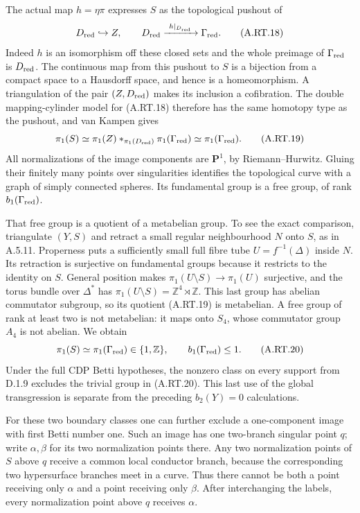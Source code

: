 The actual map $h=\eta\pi$ expresses $S$ as the topological
pushout of
\[
 D_{\rm red}\hookrightarrow Z,
 \qquad D_{\rm red}\xrightarrow{\ h|_{D_{\rm red}}\ }
                           \Gamma_{\rm red}.
 \tag{A.RT.18}
\]
Indeed $h$ is an isomorphism off these closed sets and the
whole preimage of $\Gamma_{\rm red}$ is $D_{\rm red}$.
The continuous map from this pushout to $S$ is a bijection
from a compact space to a Hausdorff space, and hence is a
homeomorphism. A triangulation of the pair
$(Z,D_{\rm red})$ makes its inclusion a cofibration.
The double mapping-cylinder model for (A.RT.18) therefore
has the same homotopy type as the pushout, and van Kampen
gives
\[
 \pi_1(S)\simeq
 \pi_1(Z)*_{\pi_1(D_{\rm red})}\pi_1(\Gamma_{\rm red})
 \simeq\pi_1(\Gamma_{\rm red}).
 \tag{A.RT.19}
\]
All normalizations of the image components are $\mathbf P^1$,
by Riemann--Hurwitz. Gluing their finitely many points over
singularities identifies the topological curve with a graph
of simply connected spheres. Its fundamental group is a
free group, of rank $b_1(\Gamma_{\rm red})$.

That free group is a quotient of a metabelian group. To see
the exact comparison, triangulate $(Y,S)$ and retract a small
regular neighbourhood $N$ onto $S$, as in A.5.11. Properness
puts a sufficiently small full fibre tube $U=f^{-1}(\Delta)$
inside $N$. Its retraction is surjective on fundamental
groups because it restricts to the identity on $S$.
General position makes
$\pi_1(U\setminus S)\to\pi_1(U)$ surjective, and the
torus bundle over $\Delta^*$ has
$\pi_1(U\setminus S)=\mathbb Z^4\rtimes\mathbb Z$.
This last group has abelian commutator subgroup, so its
quotient (A.RT.19) is metabelian. A free group of rank at
least two is not metabelian: it maps onto $S_4$, whose
commutator group $A_4$ is not abelian. We obtain
\[
 \pi_1(S)\simeq\pi_1(\Gamma_{\rm red})\in\{1,\mathbb Z\},
 \qquad b_1(\Gamma_{\rm red})\le1.
 \tag{A.RT.20}
\]
Under the full CDP Betti hypotheses, the nonzero class on
every support from D.1.9 excludes the trivial group in
(A.RT.20). This last use of the global transgression is
separate from the preceding $b_2(Y)=0$ calculations.

For these two boundary classes one can further exclude a
one-component image with first Betti number one. Such an image
has one two-branch singular point $q$; write $\alpha,\beta$
for its two normalization points there. Any two normalization
points of $S$ above $q$ receive a common local conductor branch,
because the corresponding two hypersurface branches meet in
a curve. Thus there cannot be both a point receiving only
$\alpha$ and a point receiving only $\beta$. After interchanging
the labels, every normalization point above $q$ receives
$\alpha$.

